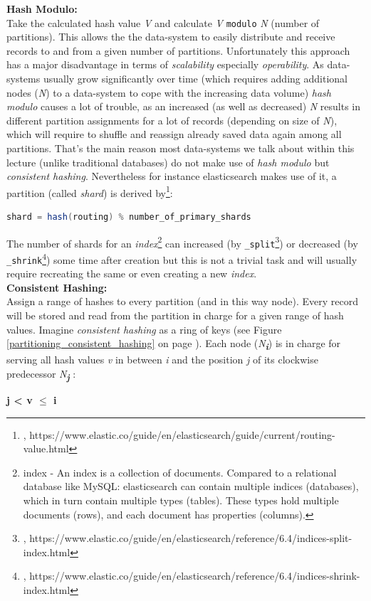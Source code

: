 {\textbf{Hash Modulo:}\\ 
Take the calculated hash value \textit{V} and calculate \textit{V} \lstinline{modulo} \textit{N} (number of partitions). This allows the the data-system to easily distribute and receive records to and from a given number of partitions. Unfortunately this approach has a major disadvantage in terms of \textit{scalability} especially \textit{operability}. As data-systems usually grow significantly over time (which requires adding additional nodes (\textit{N}) to a data-system to cope with the increasing data volume) \textit{hash modulo} causes a lot of trouble, as an increased (as well as decreased) \textit{N} results in different partition assignments for a lot of records (depending on size of \textit{N}), which will require to shuffle and reassign already saved data again among all partitions. That's the main reason most data-systems we talk about within this lecture (unlike traditional databases) do not make use of \textit{hash modulo} but \textit{consistent hashing}. Nevertheless for instance elasticsearch makes use of it, a partition (called \textit{shard}) is derived by\footnote{\cite{ESROUT}, https://www.elastic.co/guide/en/elasticsearch/guide/current/routing-value.html}:
\begin{lstlisting}[aboveskip=2ex, belowskip=2ex,emphstyle=\underbar, breaklines=true,frame=none,numbers=none,xleftmargin=0.15\textwidth,xrightmargin=0.15\textwidth,showstringspaces=false,language=java]
shard = hash(routing) % number_of_primary_shards
\end{lstlisting}
The number of shards for an \textit{index}\footnote{index - An index is a collection of documents. Compared to a relational database like MySQL: elasticsearch can contain multiple indices (databases), which in turn contain multiple types (tables). These types hold multiple documents (rows), and each document has properties (columns).} can increased (by \lstinline{_split}\footnote{\cite{ESSPLIT}, https://www.elastic.co/guide/en/elasticsearch/reference/6.4/indices-split-index.html}) or decreased (by \lstinline{_shrink}\footnote{\cite{ESSHRINK}, https://www.elastic.co/guide/en/elasticsearch/reference/6.4/indices-shrink-index.html}) some time after creation but this is not a trivial task and will usually require recreating the same or even creating a new \textit{index}.\\


\textbf{Consistent Hashing:}\\  
Assign a range of hashes to every partition (and in this way node). Every record will be stored and read from the partition in charge for a given range of hash values. Imagine \textit{consistent hashing} as a ring of keys (see Figure \ref{partitioning_consistent_hashing} on page \pageref{partitioning_consistent_hashing}). Each node (\textit{N\textsubscript{\textbf{i}}}) is in charge for serving all hash values \textit{v} in between \textit{i} and the position \textit{j} of its clockwise predecessor \textit{N\textsubscript{\textbf{j}}} :\\
\centerline{\textbf{j < v $\leq$ i}}

}
